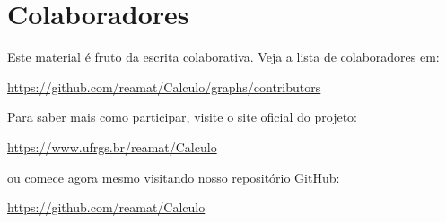 
\chapter*{Colaboradores}

Este material é fruto da escrita colaborativa. Veja a lista de colaboradores em:
\begin{center}
  \url{https://github.com/reamat/Calculo/graphs/contributors}
\end{center}

Para saber mais como participar, visite o site oficial do projeto:
\begin{center}
  \url{https://www.ufrgs.br/reamat/Calculo}
\end{center}
ou comece agora mesmo visitando nosso repositório GitHub:
\begin{center}
  \url{https://github.com/reamat/Calculo}
\end{center}




